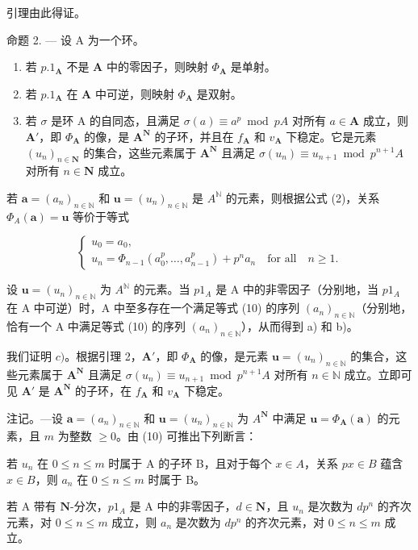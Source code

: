 引理由此得证。

命题 2. --- 设 A 为一个环。

\begin{enumerate}
\def\labelenumi{\alph{enumi})}
\item
  若 \(p.1_{\mathbf{A}}\) 不是 \(\mathbf{A}\) 中的零因子，则映射 \(\Phi_{\mathbf{A}}\) 是单射。
\item
  若 \(p.1_{\mathbf{A}}\) 在 \(\mathbf{A}\) 中可逆，则映射 \(\Phi_{\mathbf{A}}\) 是双射。
\item
  若 \(\sigma\) 是环 A 的自同态，且满足 \(\sigma(a) \equiv a^p \bmod pA\) 对所有 \(a \in \mathbf{A}\) 成立，则 \(\mathbf{A}'\)，即 \(\Phi_{\mathbf{A}}\) 的像，是 \(\mathbf{A}^{\mathbf{N}}\) 的子环，并且在 \(f_{\mathbf{A}}\) 和 \(v_{\mathbf{A}}\) 下稳定。它是元素 \((u_n)_{n \in \mathbf{N}}\) 的集合，这些元素属于 \(\mathbf{A}^{\mathbf{N}}\) 且满足 \(\sigma(u_n) \equiv u_{n+1} \bmod p^{n+1}A\) 对所有 \(n \in \mathbf{N}\) 成立。
\end{enumerate}

若 \(\boldsymbol{a} = (a_n)_{n \in \mathbb{N}}\) 和 \(\boldsymbol{u} = (u_n)_{n \in \mathbb{N}}\) 是 \(A^{\mathbb{N}}\) 的元素，则根据公式 (2)，关系 \(\Phi_A(\boldsymbol{a}) = \boldsymbol{u}\) 等价于等式

\[
\left\{ \begin{array}{l} u _ {0} = a _ {0}, \\ u _ {n} = \Phi_ {n - 1} \left(a _ {0} ^ {p}, \dots , a _ {n - 1} ^ {p}\right) + p ^ {n} a _ {n} \quad \text {for all} \quad n \geqslant 1. \end{array} \right.\tag{10}
\]

  设 \(\boldsymbol{u} = (u_{n})_{n \in \mathbb{N}}\) 为 \(A^{\mathbb{N}}\) 的元素。当 \(p1_{A}\) 是 A 中的非零因子（分别地，当 \(p1_{A}\) 在 A 中可逆）时，A 中至多存在一个满足等式 (10) 的序列 \((a_{n})_{n \in \mathbb{N}}\)（分别地，恰有一个 A 中满足等式 (10) 的序列 \((a_{n})_{n \in \mathbb{N}}\)），从而得到 a) 和 b)。

 我们证明 \(c)\)。根据引理 2，\(\mathbf{A}'\)，即 \(\Phi_{\mathbf{A}}\) 的像，是元素 \(\boldsymbol{u} = (u_n)_{n \in \mathbb{N}}\) 的集合，这些元素属于 \(\mathbf{A}^{\mathbf{N}}\) 且满足 \(\sigma(u_n) \equiv u_{n+1} \bmod p^{n+1}A\) 对所有 \(n \in \mathbb{N}\) 成立。立即可见 \(\mathbf{A}'\) 是 \(\mathbf{A}^{\mathbf{N}}\) 的子环，在 \(f_{\mathbf{A}}\) 和 \(v_{\mathbf{A}}\) 下稳定。

注记。—设 \(\boldsymbol{a} = (a_n)_{n \in \mathbb{N}}\) 和 \(\boldsymbol{u} = (u_n)_{n \in \mathbb{N}}\) 为 \(A^{\mathbf{N}}\) 中满足 \(\boldsymbol{u} = \Phi_{\mathbf{A}}(\boldsymbol{a})\) 的元素，且 \(m\) 为整数 \(\geqslant 0\)。由 (10) 可推出下列断言：

若 \(u_n\) 在 \(0 \leqslant n \leqslant m\) 时属于 A 的子环 B，且对于每个 \(x \in A\)，关系 \(px \in B\) 蕴含 \(x \in B\)，则 \(a_n\) 在 \(0 \leqslant n \leqslant m\) 时属于 B。

若 A 带有 \(\mathbf{N}\)-分次，\(p1_{A}\) 是 A 中的非零因子，\(d \in \mathbf{N}\)，且 \(u_{n}\) 是次数为 \(dp^{n}\) 的齐次元素，对 \(0 \leqslant n \leqslant m\) 成立，则 \(a_{n}\) 是次数为 \(dp^{n}\) 的齐次元素，对 \(0 \leqslant n \leqslant m\) 成立。


